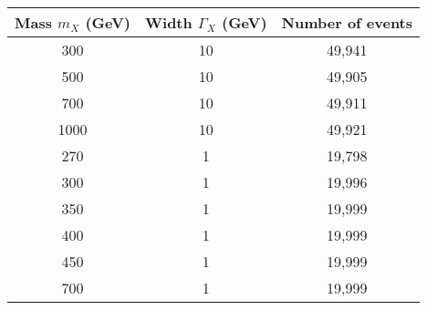 \begin{tabular}{|c|c|c|}
\hline
Mass $m_X$ (GeV) & Width $\Gamma_X$ (GeV) & Number of events \\ \hline
300 & 10 & 49,941 \\
500 & 10 & 49,905 \\
700 & 10 & 49,911 \\
1000& 10 & 49,921 \\\hline
270 &  1 & 19,798 \\
300 &  1 & 19,996 \\
350 &  1 & 19,999 \\
400 &  1 & 19,999 \\
450 &  1 & 19,999 \\
700 &  1 & 19,999 \\
\hline
\end{tabular}
